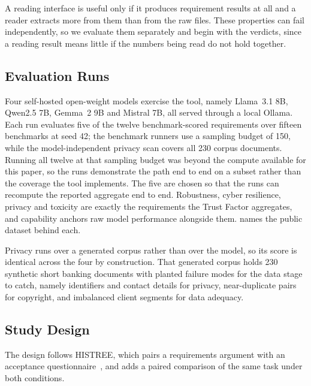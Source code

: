 \documentclass[10pt,conference,a4paper]{IEEEtran}
\begin{document}
A reading interface is useful only if it produces requirement results at all and a reader extracts more from them than from the raw files.
These properties can fail independently, so we evaluate them separately and begin with the verdicts, since a reading result means little if the numbers being read do not hold together.

\subsection{Evaluation Runs}
\label{sec:panels}
Four self-hosted open-weight models exercise the tool, namely Llama~3.1 8B, Qwen2.5 7B, Gemma~2 9B and Mistral 7B, all served through a local Ollama.
Each run evaluates five of the twelve benchmark-scored requirements over fifteen benchmarks at seed 42; the benchmark runners use a sampling budget of 150, while the model-independent privacy scan covers all 230 corpus documents.
Running all twelve at that sampling budget was beyond the compute available for this paper, so the runs demonstrate the path end to end on a subset rather than the coverage the tool implements.
The five are chosen so that the runs can recompute the reported aggregate end to end.
Robustness, cyber resilience, privacy and toxicity are exactly the requirements the Trust Factor aggregates, and capability anchors raw model performance alongside them.
 names the public dataset behind each.

Privacy runs over a generated corpus rather than over the model, so its score is identical across the four by construction.
That generated corpus holds 230 synthetic short banking documents with planted failure modes for the data stage to catch, namely identifiers and contact details for privacy, near-duplicate pairs for copyright, and imbalanced client segments for data adequacy.

\subsection{Study Design}
The design follows HISTREE, which pairs a requirements argument with an acceptance questionnaire~\cite{studtmann2023histree,davis1989tam}, and adds a paired comparison of the same task under both conditions.
\end{document}
